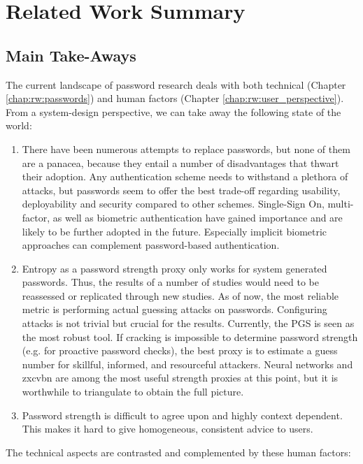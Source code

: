 
\chapter[Related Work Summary]{Related Work Summary}\label{chap:rw:summary}

\section*{Main Take-Aways}
The current landscape of password research deals with both technical (Chapter \ref{chap:rw:passwords}) and human factors (Chapter \ref{chap:rw:user_perspective}). From a system-design perspective, we can take away the following state of the world:
\begin{enumerate}
	\item There have been numerous attempts to replace passwords, but none of them are a panacea, because they entail a number of disadvantages that thwart their adoption. Any authentication scheme needs to withstand a plethora of attacks, but passwords seem to offer the best trade-off regarding usability, deployability and security compared to other schemes. Single-Sign On, multi-factor, as well as biometric authentication have gained importance and are likely to be further adopted in the future. Especially implicit biometric approaches can complement password-based authentication.
	\item Entropy as a password strength proxy only works for system generated passwords. Thus, the results of a number of studies would need to be reassessed or replicated through new studies. As of now, the most reliable metric is performing actual guessing attacks on passwords. Configuring attacks is not trivial but crucial for the results. Currently, the \acrfull{PGS} is seen as the most robust tool. If cracking is impossible to determine password strength (e.g. for proactive password checks), the best proxy is to estimate a guess number for skillful, informed, and resourceful attackers. Neural networks and zxcvbn are among the most useful strength proxies at this point, but it is worthwhile to triangulate to obtain the full picture.  
	\item Password strength is difficult to agree upon and highly context dependent. This makes it hard to give homogeneous, consistent advice to users.
\end{enumerate}
The technical aspects are contrasted and complemented by these human factors:
